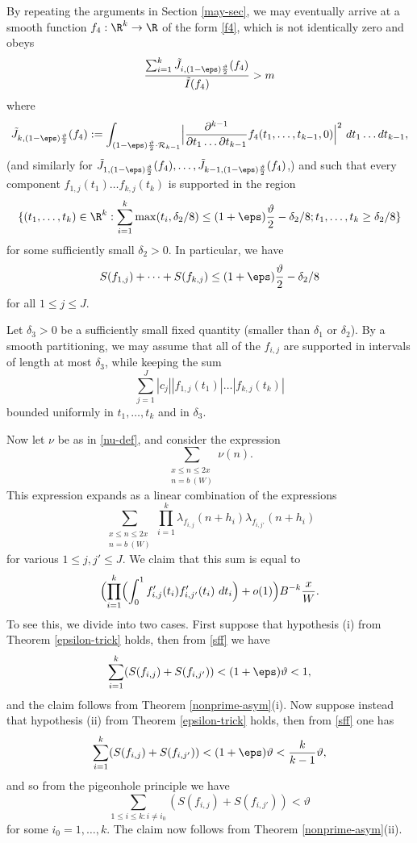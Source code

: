 By repeating the arguments in Section \ref{may-sec}, we may eventually arrive at a smooth function $f_4: \R^k \to \R$ of the form \eqref{f4}, which is not identically zero and obeys 
\begin{equation}\label{f4-ratio}
\frac{\sum_{i=1}^k \tilde J_{i,(1-\eps) \frac{\vartheta}{2}}(f_4)}{\tilde I(f_4)} > m
\end{equation}
where
$$ \tilde J_{k, (1-\eps) \frac{\vartheta}{2}}(f_4) := \int_{(1-\eps) \frac{\vartheta}{2} \cdot {\mathcal R}_{k-1}} \Bigl|\frac{\partial^{k-1}}{\partial t_1 \dots \partial t_{k-1}} f_4(t_1,\dots,t_{k-1},0)\Bigr|^2\ dt_1 \dots dt_{k-1},$$
(and similarly for $\tilde J_{1, (1-\eps) \frac{\vartheta}{2}}(f_4),\dots, \tilde J_{k-1, (1-\eps) \frac{\vartheta}{2}}(f_4)$,) and such that every component $f_{1,j}(t_1) \dots f_{k,j}(t_k)$ is supported in the region
$$ \{ (t_1,\dots,t_k) \in \R^k: \sum_{i=1}^k \max(t_i, \delta_2/8) \leq (1+\eps) \frac{\vartheta}{2} - \delta_2/8; t_1,\dots,t_k\ge \delta_2/8 \}$$
for some sufficiently small $\delta_2>0$.  In particular, we have
\begin{equation}\label{sff}
S(f_{1,j}) + \dots + S(f_{k,j}) \leq (1+\eps) \frac{\vartheta}{2} - \delta_2/8
\end{equation}
for all $1 \leq j \leq J$.  

Let $\delta_3 > 0$ be a sufficiently small fixed quantity (smaller than $\delta_1$ or $\delta_2$).  By a smooth partitioning, we may assume that all of the $f_{i,j}$ are supported in intervals of length at most $\delta_3$, while keeping the sum
\begin{equation}\label{abs-sum}
\sum_{j=1}^J |c_j| |f_{1,j}(t_1)| \dots |f_{k,j}(t_k)|
\end{equation}
bounded uniformly in $t_1,\dots,t_k$ and in $\delta_3$.

Now let $\nu$ be as in \eqref{nu-def}, and consider the expression
$$ \sum_{\substack{x \leq n \leq 2x\\ n = b\ (W)}} \nu(n).$$
This expression expands as a linear combination of the expressions
$$ \sum_{\substack{x \leq n \leq 2x\\ n = b\ (W)}} \prod_{i=1}^k \lambda_{f_{i,j}}(n+h_i) \lambda_{f_{i,j'}}(n+h_i)$$
for various $1 \leq j,j' \leq J$.  We claim that this sum is equal to
$$ \Bigl(\prod_{i=1}^k\Bigl( \int_0^1 f'_{i,j}(t_i) f'_{i,j'}(t_i)\ dt_i\Bigr) + o(1)\Bigr) B^{-k} \frac{x}{W}.$$
To see this, we divide into two cases.  First suppose that hypothesis (i) from Theorem \ref{epsilon-trick} holds, then from \eqref{sff} we have
$$ \sum_{i=1}^k (S(f_{i,j}) + S(f_{i,j'}) )< (1+\eps) \vartheta < 1, $$
and the claim follows from Theorem \ref{nonprime-asym}(i).  Now suppose instead that hypothesis (ii) from Theorem \ref{epsilon-trick} holds, then from \eqref{sff} one has
$$ \sum_{i=1}^k ( S(f_{i,j}) + S(f_{i,j'}) ) < (1+\eps) \vartheta < \frac{k}{k-1} \vartheta,$$
and so from the pigeonhole principle we have
$$ \sum_{1 \leq i \leq k: i \neq i_0} ( S(f_{i,j}) + S(f_{i,j'}) ) < \vartheta$$
for some $i_0 = 1,\ldots,k$.  The claim now follows from Theorem \ref{nonprime-asym}(ii).

